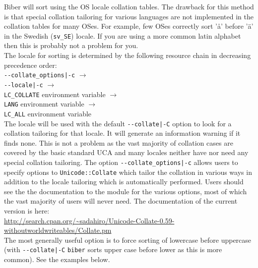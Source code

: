 \documentclass{ltxdockit}
\def\biberex#1{\hbox{\hspace{-4em}\texttt{\small \detokenize{#1}}}}
\begin{document}
\biberex{--fastsort|-f} Biber will sort using
  the OS locale collation tables. The drawback for this method is that special
  collation tailoring for various languages are not implemented in the
  collation tables for many OSes. For example, few OSes correctly sort 'å'
  before 'ä' in the Swedish (\verb=sv_SE=) locale. If you are using a more
  common latin alphabet then this is probably not a problem for you.\\[2ex]

\noindent The locale for sorting is determined by the following resource
chain in decreasing precedence order:\\[2ex]

\noindent\verb=--collate_options|-c= $\rightarrow$\\
\hspace*{2em}\verb=--locale|-c= $\rightarrow$\\
\hspace*{4em}\verb=LC_COLLATE= environment variable $\rightarrow$\\
\hspace*{6em}\verb=LANG= environment variable $\rightarrow$\\
\hspace*{8em}\verb=LC_ALL= environment variable\\[2ex]

\noindent The locale will be used with the default \verb=--collate|-C= option
to look for a collation tailoring for that locale. It will generate an
information warning if it finds none. This is not a problem as the vast
majority of collation cases are covered by the basic standard UCA and many
locales neither have nor need any special collation tailoring. The
option \verb=--collate_options|-c= allows users to specify
options to \verb=Unicode::Collate= which tailor the collation in various ways in
addition to the locale tailoring which is automatically performed.
Users should see the the documentation to the module for the various
options, most of which the vast majority of users will never need. The
documentation of the current version is here:\\[2ex]

\noindent\url{http://search.cpan.org/~sadahiro/Unicode-Collate-0.59-withoutworldwriteables/Collate.pm}\\[2ex]

\noindent The most generally useful option is to force sorting of lowercase
before uppercase (with \verb=--collate|-C= \verb=biber= sorts upper case before lower
as this is more common). See the examples below.
\end{document}
